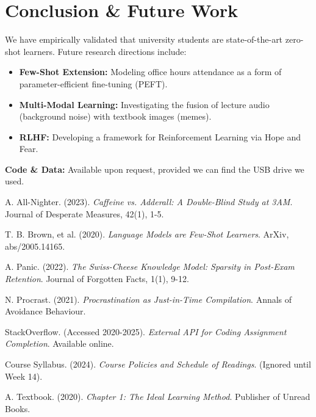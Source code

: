 \documentclass[11pt]{article}
\begin{document}
\section{Conclusion \& Future Work}
We have empirically validated that university students are state-of-the-art zero-shot learners. Future research directions include:
\begin{itemize}
    \item \textbf{Few-Shot Extension:} Modeling office hours attendance as a form of parameter-efficient fine-tuning (PEFT).
    \item \textbf{Multi-Modal Learning:} Investigating the fusion of lecture audio (background noise) with textbook images (memes).
    \item \textbf{RLHF:} Developing a framework for Reinforcement Learning via Hope and Fear.
\end{itemize}
\textbf{Code \& Data:} Available upon request, provided we can find the USB drive we used.

\begin{thebibliography}{9}

A. All-Nighter. (2023).
\textit{Caffeine vs. Adderall: A Double-Blind Study at 3AM}.
Journal of Desperate Measures, 42(1), 1-5.

T. B. Brown, et al. (2020).
\textit{Language Models are Few-Shot Learners}.
ArXiv, abs/2005.14165.

A. Panic. (2022). 
\textit{The Swiss-Cheese Knowledge Model: Sparsity in Post-Exam Retention}. 
Journal of Forgotten Facts, 1(1), 9-12.

N. Procrast. (2021). 
\textit{Procrastination as Just-in-Time Compilation}. 
Annals of Avoidance Behaviour.

StackOverflow. (Accessed 2020-2025). 
\textit{External API for Coding Assignment Completion}. 
Available online.

Course Syllabus. (2024).
\textit{Course Policies and Schedule of Readings}.
(Ignored until Week 14).

A. Textbook. (2020). \textit{Chapter 1: The Ideal Learning Method}. Publisher of Unread Books.

\end{thebibliography}
\end{document}
